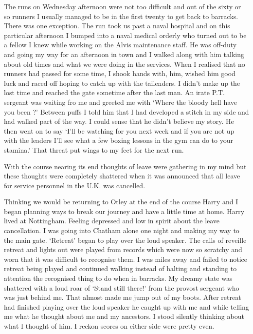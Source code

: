 The runs on Wednesday afternoon were not too difficult and out of the
sixty or so runners I usually managed to be in the first twenty to get
back to barracks. There was one exception. The run took us past a
naval hospital and on this particular afternoon I bumped into a
naval medical orderly who turned out to be a fellow I knew while
working on the Alvis maintenance staff. He was off-duty and going my
way for an afternoon in town and I walked along with him talking about
old times and what we were doing in the services. When I realised that
no runners had passed for some time, I shook hands with, him, wished
him good luck and raced off hoping to catch up with the tailenders. 
I didn't make up the lost time and reached the gate sometime
after the last man. An irate P.T. sergeant was waiting fro me and
greeted me with `Where the bloody hell have you been ?' Between puffs
I told him that I had developed a stitch in my side and had walked
part of the way. I could sense that he didn't believe my story. He
then went on to say `I'll be watching for you next week and if you
are not up with the leaders I'll see what a few boxing lessons in the
gym can do to your stamina.' That threat put wings to my feet for the
next run.

With the course nearing its end thoughts of leave were gathering in my
mind but these thoughts were completely shattered when it was
announced that all leave for service personnel in the U.K. was
cancelled.

Thinking we would be returning to Otley at the end of the course Harry
and I began planning ways to break our journey and have a little time
at home. Harry lived at Nottingham. Feeling depressed and low in
spirit about the leave cancellation. I was going into Chatham alone
one night and making my way to the main gate. `Retreat' began to play
over the loud speaker. The calls of reveille retreat and lights out
were played from records which were now so scratchy and worn that it
was difficult to recognise them. I was miles away and failed to notice
retreat being played and continued walking instead of halting and
standing to attention the recognised thing to do when in barracks. My
dreamy state was shattered with a loud roar of `Stand still there!' from
the provost sergeant who was just behind me. That almost made me jump
out of my boots. After retreat had finished playing over the loud
speaker he caught up with me and while telling me what he thought
about me and my ancestors. I stood silently thinking about what I
thought of him. I reckon scores on either side were pretty even.


